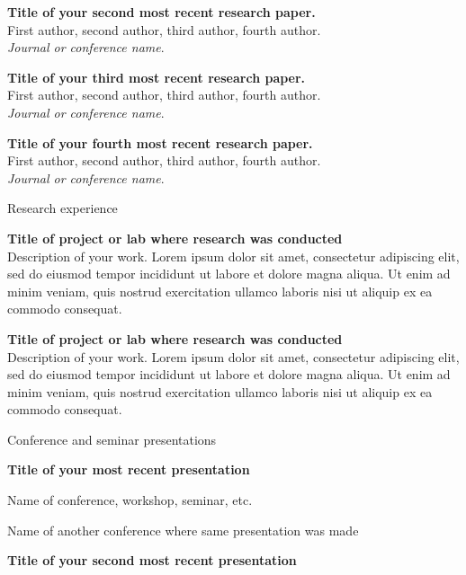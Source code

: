 \documentclass[letterpaper, 10pt]{article}
\newcommand{\heading}[1]{{\large\color{Mahogany} #1}\medskip}
\begin{document}
\textbf{Title of your second most recent research paper.} \\ 
First author, second author, third author, fourth author. \\
\textit{Journal or conference name}. \medskip

\textbf{Title of your third most recent research paper.} \\ 
First author, second author, third author, fourth author. \\
\textit{Journal or conference name}. \medskip

\textbf{Title of your fourth most recent research paper.} \\ 
First author, second author, third author, fourth author. \\
\textit{Journal or conference name}.

\bigskip\bigskip


\heading{Research experience}

\textbf{Title of project or lab where research was conducted} \\
Description of your work. Lorem ipsum dolor sit amet, consectetur adipiscing elit, sed do eiusmod tempor incididunt ut labore et dolore magna aliqua. Ut enim ad minim veniam, quis nostrud exercitation ullamco laboris nisi ut aliquip ex ea commodo consequat. \medskip

\textbf{Title of project or lab where research was conducted} \\
Description of your work. Lorem ipsum dolor sit amet, consectetur adipiscing elit, sed do eiusmod tempor incididunt ut labore et dolore magna aliqua. Ut enim ad minim veniam, quis nostrud exercitation ullamco laboris nisi ut aliquip ex ea commodo consequat.

\bigskip\bigskip


\heading{Conference and seminar presentations}

\textbf{Title of your most recent presentation}

Name of conference, workshop, seminar, etc.

Name of another conference where same presentation was made\medskip

\textbf{Title of your second most recent presentation}
\end{document}
